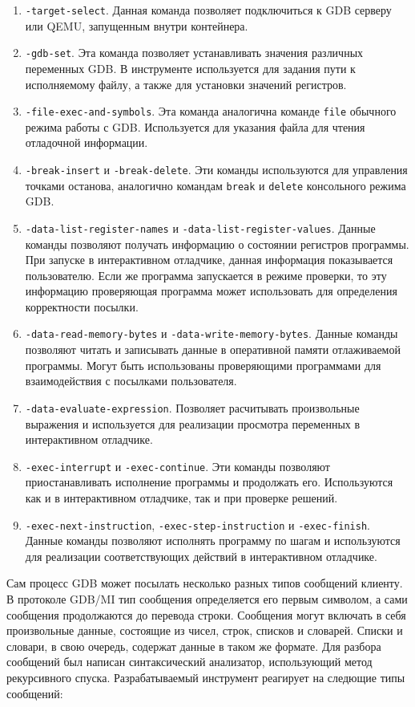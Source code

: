 \documentclass[a4paper,article,14pt]{extarticle}
\begin{document}
\begin{enumerate}
    \item \texttt{-target-select}. Данная команда позволяет подключиться к GDB серверу или QEMU, запущенным внутри контейнера.
    \item \texttt{-gdb-set}. Эта команда позволяет устанавливать значения различных переменных GDB. В инструменте используется для задания пути к исполняемому файлу, а также для установки значений регистров.
    \item \texttt{-file-exec-and-symbols}. Эта команда аналогична команде \texttt{file} обычного режима работы с GDB. Используется для указания файла для  чтения отладочной информации.
    \item \texttt{-break-insert} и \texttt{-break-delete}. Эти команды используются для управления точками останова, аналогично командам \texttt{break} и \texttt{delete} консольного режима GDB.
    \item \texttt{-data-list-register-names} и \texttt{-data-list-register-values}. Данные команды позволяют получать информацию о состоянии регистров программы. При запуске в интерактивном отладчике, данная информация показывается пользователю. Если же программа запускается в режиме проверки, то эту информацию проверяющая программа может использовать для определения корректности посылки.
    \item \texttt{-data-read-memory-bytes} и \texttt{-data-write-memory-bytes}. Данные команды позволяют читать и записывать данные в оперативной памяти отлаживаемой программы. Могут быть использованы проверяющими программами для взаимодействия с посылками пользователя.
    \item \texttt{-data-evaluate-expression}. Позволяет расчитывать произвольные выражения и используется для реализации просмотра переменных в интерактивном отладчике.
    \item \texttt{-exec-interrupt} и \texttt{-exec-continue}. Эти команды позволяют приостанавливать исполнение программы и продолжать его. Используются как и в интерактивном отладчике, так и при проверке решений.
    \item \texttt{-exec-next-instruction}, \texttt{-exec-step-instruction} и \texttt{-exec-finish}. Данные команды позволяют исполнять программу по шагам и используются для реализации соответствующих действий в интерактивном отладчике.
\end{enumerate}

Сам процесс GDB может посылать несколько разных типов сообщений клиенту. В протоколе GDB/MI тип сообщения определяется его первым символом, а сами сообщения продолжаются до перевода строки. Сообщения могут включать в себя произвольные данные, состоящие из чисел, строк, списков и словарей. Списки и словари, в свою очередь, содержат данные в таком же формате. Для разбора сообщений был написан синтаксический анализатор, использующий метод рекурсивного спуска\cite{parsing}. Разрабатываемый инструмент реагирует на следющие типы сообщений:
\end{document}
